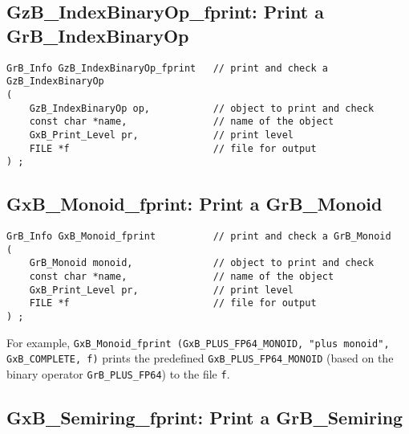 \documentclass[12pt]{article}
\begin{document}
\newpage
\subsection{{\sf GzB\_IndexBinaryOp\_fprint:} Print a {\sf GrB\_IndexBinaryOp}}

\begin{mdframed}[userdefinedwidth=6in]
{\footnotesize
\begin{verbatim}
GrB_Info GzB_IndexBinaryOp_fprint   // print and check a GzB_IndexBinaryOp
(
    GzB_IndexBinaryOp op,           // object to print and check
    const char *name,               // name of the object
    GxB_Print_Level pr,             // print level
    FILE *f                         // file for output
) ;
\end{verbatim} } \end{mdframed}

\subsection{{\sf GxB\_Monoid\_fprint:} Print a {\sf GrB\_Monoid}}

\begin{mdframed}[userdefinedwidth=6in]
{\footnotesize
\begin{verbatim}
GrB_Info GxB_Monoid_fprint          // print and check a GrB_Monoid
(
    GrB_Monoid monoid,              // object to print and check
    const char *name,               // name of the object
    GxB_Print_Level pr,             // print level
    FILE *f                         // file for output
) ;
\end{verbatim} } \end{mdframed}

For example,
\verb'GxB_Monoid_fprint (GxB_PLUS_FP64_MONOID, "plus monoid",'
\verb'GxB_COMPLETE, f)'
prints the predefined \verb'GxB_PLUS_FP64_MONOID' (based on the binary
operator \verb'GrB_PLUS_FP64') to the file \verb'f'.

\subsection{{\sf GxB\_Semiring\_fprint:} Print a {\sf GrB\_Semiring}}
\end{document}
